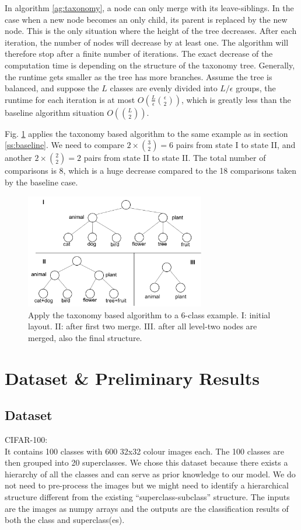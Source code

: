 \documentclass{article}
\begin{document}
In algorithm \ref{ag:taxonomy}, a node can only merge with its leave-siblings. In the case when a new node becomes an only child, its parent is replaced by the new node. This is the only situation where the height of the tree decreases. After each iteration, the number of nodes will decrease by at least one. The algorithm will therefore stop after a finite number of iterations. The exact decrease of the computation time is depending on the structure of the taxonomy tree. Generally, the runtime gets smaller as the tree has more branches. Assume the tree is balanced, and suppose the $L$ classes are evenly divided into $L/\epsilon$ groups, the runtime for each iteration is at most $O(\frac{L}{\epsilon}\binom{\epsilon}{2})$, which is greatly less than the baseline algorithm situation $O(\binom{L}{2})$.

Fig. \ref{fig:example_taxonomy} applies the taxonomy based algorithm to the same example as in section \ref{ss:baseline}. We need to compare $2\times\binom{3}{2}=6$ pairs from state I to state II, and another $2\times \binom{2}{2}=2$ pairs from state II to state II. The total number of comparisons is 8, which is a huge decrease compared to the 18 comparisons taken by the baseline case.

\begin{figure}[ht]\label{fig:example_taxonomy}
  \centering
  \includegraphics[width=0.7\textwidth]{6_class2.png}
  \caption{Apply the taxonomy based algorithm to a 6-class example. I: initial layout. II: after first two merge. III. after all level-two nodes are merged, also the final structure.}
\end{figure}

\section{Dataset \& Preliminary Results}
\subsection{Dataset}
CIFAR-100:\\
It contains 100 classes with 600 32x32 colour images each. The 100 classes are then grouped into 20 superclasses. 
We chose this dataset because there exists a hierarchy of all the classes and can serve as prior knowledge to our model. 
We do not need to pre-process the images but we might need to identify a hierarchical structure different from the existing “superclass-subclass” structure. The inputs are the images as numpy arrays and the outputs are the classification results of both the class and superclass(es). 
\end{document}
